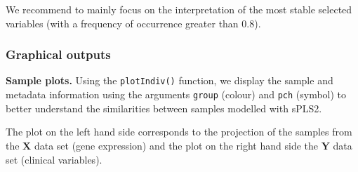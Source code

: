 \documentclass[]{book}
\newenvironment{Shaded}{\begin{snugshade}}{\end{snugshade}}
\newcommand{\DataTypeTok}[1]{\textcolor[rgb]{0.13,0.29,0.53}{#1}}
\newcommand{\DecValTok}[1]{\textcolor[rgb]{0.00,0.00,0.81}{#1}}
\newcommand{\KeywordTok}[1]{\textcolor[rgb]{0.13,0.29,0.53}{\textbf{#1}}}
\newcommand{\NormalTok}[1]{#1}
\newcommand{\OperatorTok}[1]{\textcolor[rgb]{0.81,0.36,0.00}{\textbf{#1}}}
\newcommand{\OtherTok}[1]{\textcolor[rgb]{0.56,0.35,0.01}{#1}}
\newcommand{\StringTok}[1]{\textcolor[rgb]{0.31,0.60,0.02}{#1}}
\begin{document}
We recommend to mainly focus on the interpretation of the most stable selected variables (with a frequency of occurrence greater than 0.8).

\hypertarget{pls:result:graph}{%
\subsubsection{Graphical outputs}\label{pls:result:graph}}

\textbf{Sample plots.}
Using the \texttt{plotIndiv()} function, we display the sample and metadata information using the arguments \texttt{group} (colour) and \texttt{pch} (symbol) to better understand the similarities between samples modelled with sPLS2.

The plot on the left hand side corresponds to the projection of the samples from the \(\boldsymbol X\) data set (gene expression) and the plot on the right hand side the \(\boldsymbol Y\) data set (clinical variables).

\begin{Shaded}
\end{Shaded}
\end{document}
